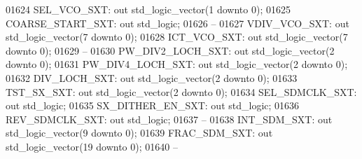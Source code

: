 \begin{DoxyCode}
01624         SEL\_VCO\_SXT:    \textcolor{keywordflow}{out} \textcolor{comment}{std\_logic\_vector}(\textcolor{vhdllogic}{}\textcolor{vhdllogic}{1} \textcolor{keywordflow}{downto} \textcolor{vhdllogic}{}\textcolor{vhdllogic}{0});
01625         COARSE\_START\_SXT:   \textcolor{keywordflow}{out} \textcolor{comment}{std\_logic};
01626 \textcolor{keyword}{        --}
01627         VDIV\_VCO\_SXT:   \textcolor{keywordflow}{out} \textcolor{comment}{std\_logic\_vector}(\textcolor{vhdllogic}{}\textcolor{vhdllogic}{7} \textcolor{keywordflow}{downto} \textcolor{vhdllogic}{}\textcolor{vhdllogic}{0});
01628         ICT\_VCO\_SXT:    \textcolor{keywordflow}{out} \textcolor{comment}{std\_logic\_vector}(\textcolor{vhdllogic}{}\textcolor{vhdllogic}{7} \textcolor{keywordflow}{downto} \textcolor{vhdllogic}{}\textcolor{vhdllogic}{0});
01629 \textcolor{keyword}{        --}
01630         PW\_DIV2\_LOCH\_SXT:   \textcolor{keywordflow}{out} \textcolor{comment}{std\_logic\_vector}(\textcolor{vhdllogic}{}\textcolor{vhdllogic}{2} \textcolor{keywordflow}{downto} \textcolor{vhdllogic}{}\textcolor{vhdllogic}{0});
01631         PW\_DIV4\_LOCH\_SXT:   \textcolor{keywordflow}{out} \textcolor{comment}{std\_logic\_vector}(\textcolor{vhdllogic}{}\textcolor{vhdllogic}{2} \textcolor{keywordflow}{downto} \textcolor{vhdllogic}{}\textcolor{vhdllogic}{0});
01632         DIV\_LOCH\_SXT:   \textcolor{keywordflow}{out} \textcolor{comment}{std\_logic\_vector}(\textcolor{vhdllogic}{}\textcolor{vhdllogic}{2} \textcolor{keywordflow}{downto} \textcolor{vhdllogic}{}\textcolor{vhdllogic}{0});
01633         TST\_SX\_SXT:     \textcolor{keywordflow}{out} \textcolor{comment}{std\_logic\_vector}(\textcolor{vhdllogic}{}\textcolor{vhdllogic}{2} \textcolor{keywordflow}{downto} \textcolor{vhdllogic}{}\textcolor{vhdllogic}{0});
01634         SEL\_SDMCLK\_SXT: \textcolor{keywordflow}{out} \textcolor{comment}{std\_logic};
01635         SX\_DITHER\_EN\_SXT:   \textcolor{keywordflow}{out} \textcolor{comment}{std\_logic};
01636         REV\_SDMCLK\_SXT: \textcolor{keywordflow}{out} \textcolor{comment}{std\_logic};
01637 \textcolor{keyword}{        --}
01638         INT\_SDM\_SXT:    \textcolor{keywordflow}{out} \textcolor{comment}{std\_logic\_vector}(\textcolor{vhdllogic}{}\textcolor{vhdllogic}{9} \textcolor{keywordflow}{downto} \textcolor{vhdllogic}{}\textcolor{vhdllogic}{0});
01639         FRAC\_SDM\_SXT:   \textcolor{keywordflow}{out} \textcolor{comment}{std\_logic\_vector}(\textcolor{vhdllogic}{}\textcolor{vhdllogic}{19} \textcolor{keywordflow}{downto} \textcolor{vhdllogic}{}\textcolor{vhdllogic}{0});
01640 \textcolor{keyword}{        --}

\end{DoxyCode}
